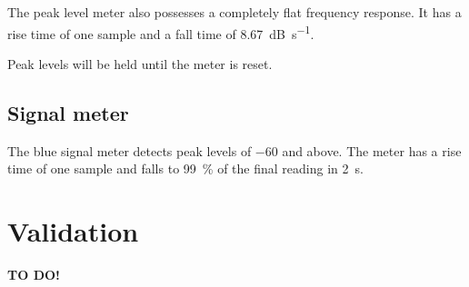 The peak level meter also possesses a completely flat frequency
response.  It has a rise time of one sample and a fall time of
\SI{8.67}{\dB\per\second}.

Peak levels will be held until the meter is reset.

\section{Signal meter}

The blue signal meter detects peak levels of \SI{-60}{\dBFS} and
above.  The meter has a rise time of one sample and falls to
\SI{99}{\percent} of the final reading in \SI{2}{\second}.

\chapter{Validation}
\label{chap:validation}

\textbf{TO DO!}






